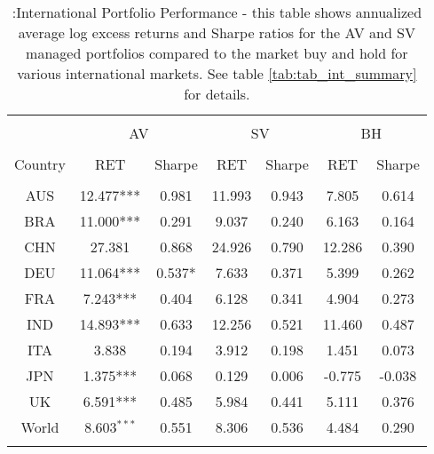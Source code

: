 
\begin{table}[!htbp] \centering 
  \caption{:International Portfolio Performance - this table shows annualized average log excess returns and Sharpe ratios for the AV and SV managed portfolios compared to the market buy and hold for various international markets. See table \ref{tab:tab_int_summary} for details.} 
  \label{tab:tab_intPerf1} 
\begin{tabular}{@{\extracolsep{5pt}} ccccccc} 
\\[-1.8ex]\hline 
\hline \\[-1.8ex]
& \multicolumn{2}{c}{AV} &\multicolumn{2}{c}{SV}& \multicolumn{2}{c}{BH}\\
\cline{2-3} \cline{4-5} \cline{6-7}\\
Country & RET & Sharpe & RET & Sharpe & RET & Sharpe \\ 
\hline \\[-1.8ex] 
AUS & 12.477*** & 0.981 & 11.993 & 0.943 & 7.805 & 0.614 \\ 
BRA & 11.000*** & 0.291 & 9.037 & 0.240 & 6.163 & 0.164 \\ 
CHN & 27.381 & 0.868 & 24.926 & 0.790 & 12.286 & 0.390 \\ 
DEU & 11.064*** & 0.537* & 7.633 & 0.371 & 5.399 & 0.262 \\ 
FRA & 7.243*** & 0.404 & 6.128 & 0.341 & 4.904 & 0.273 \\ 
IND & 14.893*** & 0.633 & 12.256 & 0.521 & 11.460 & 0.487 \\ 
ITA & 3.838 & 0.194 & 3.912 & 0.198 & 1.451 & 0.073 \\ 
JPN & 1.375*** & 0.068 & 0.129 & 0.006 & -0.775 & -0.038 \\ 
UK & 6.591*** & 0.485 & 5.984 & 0.441 & 5.111 & 0.376 \\ 
World & 8.603$^{***}$ & 0.551 &  8.306 & 0.536  & 4.484 & 0.290\\
\hline \\[-1.8ex] 
\end{tabular} 
\end{table} 
